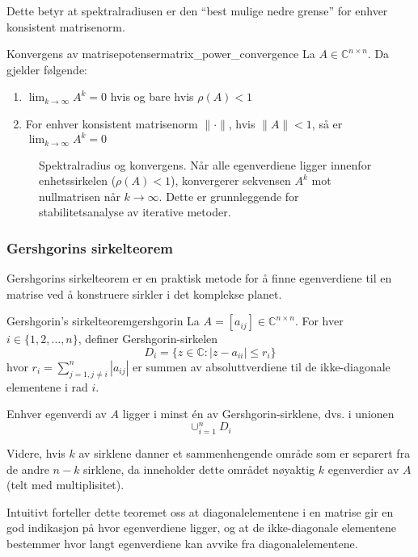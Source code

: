 Dette betyr at spektralradiusen er den \enquote{best mulige nedre grense} for enhver konsistent matrisenorm.

\begin{remark}{Konvergens av matrisepotenser}{matrix_power_convergence}
	La $A \in \mathbb{C}^{n \times n}$. Da gjelder følgende:
	\begin{enumerate}
		\item $\lim_{k \to \infty} A^k = 0$ hvis og bare hvis $\rho(A) < 1$
		\item For enhver konsistent matrisenorm $\|\cdot\|$, hvis $\|A\| < 1$, så er $\lim_{k \to \infty} A^k = 0$
	\end{enumerate}
\end{remark}

\begin{figure}
	\centering
	
	\caption{Spektralradius og konvergens. Når alle egenverdiene ligger innenfor enhetssirkelen ($\rho(A) < 1$), konvergerer sekvensen $A^k$ mot nullmatrisen når $k \to \infty$. Dette er grunnleggende for stabilitetsanalyse av iterative metoder.}
	\label{fig:spectral_radius}
\end{figure}

\subsubsection{Gershgorins sirkelteorem}
Gershgorins sirkelteorem er en praktisk metode for å finne egenverdiene til en matrise ved å konstruere sirkler i det komplekse planet.

\begin{theorem}{Gershgorin's sirkelteorem}{gershgorin}
	La $A = [a_{ij}] \in \mathbb{C}^{n \times n}$. For hver $i \in \{1,2,\ldots,n\}$, definer Gershgorin-sirkelen
	\[
		D_i = \{z \in \mathbb{C} : |z - a_{ii}| \leq r_i\}
	\]
	hvor $r_i = \sum_{j=1,j\neq i}^{n} |a_{ij}|$ er summen av absoluttverdiene til de ikke-diagonale elementene i rad $i$.

	Enhver egenverdi av $A$ ligger i minst én av Gershgorin-sirklene, dvs. i unionen
	\[
		\cup_{i=1}^{n} D_i
	\]

	Videre, hvis $k$ av sirklene danner et sammenhengende område som er separert fra de andre $n-k$ sirklene, da inneholder dette området nøyaktig $k$ egenverdier av $A$ (telt med multiplisitet).
\end{theorem}

Intuitivt forteller dette teoremet oss at diagonalelementene i en matrise gir en god indikasjon på hvor egenverdiene ligger, og at de ikke-diagonale elementene bestemmer hvor langt egenverdiene kan avvike fra diagonalelementene.

